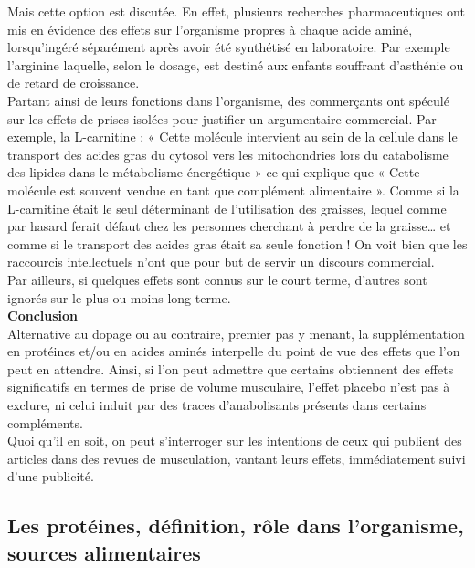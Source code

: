 \documentclass[8pt]{article}
\begin{document}
Mais cette option est discutée. En effet, plusieurs recherches pharmaceutiques ont mis en évidence des effets sur l’organisme propres à chaque acide aminé, lorsqu’ingéré séparément après avoir été synthétisé en laboratoire. Par exemple l’arginine laquelle, selon le dosage, est destiné aux enfants souffrant d’asthénie ou de retard de croissance.\\

Partant ainsi de leurs fonctions dans l’organisme, des commerçants ont spéculé sur les effets de prises isolées pour justifier un argumentaire commercial. Par exemple, la L-carnitine : « Cette molécule intervient au sein de la cellule dans le transport des acides gras du cytosol vers les mitochondries lors du catabolisme des lipides dans le métabolisme énergétique » ce qui explique que « Cette molécule est souvent vendue en tant que complément alimentaire ». Comme si la L-carnitine était le seul déterminant de l’utilisation des graisses, lequel comme par hasard ferait défaut chez les personnes cherchant à perdre de la graisse… et comme si le transport des acides gras était sa seule fonction ! On voit bien que les raccourcis intellectuels n’ont que pour but de servir un discours commercial.\\

Par ailleurs, si quelques effets sont connus sur le court terme, d’autres sont ignorés sur le plus ou moins long terme.\\


\textbf{Conclusion}\\

Alternative au dopage ou au contraire, premier pas y menant, la supplémentation en protéines et/ou en acides aminés interpelle du point de vue des effets que l’on peut en attendre. Ainsi, si l’on peut admettre que certains obtiennent des effets significatifs en termes de prise de volume musculaire, l’effet placebo n’est pas à exclure, ni celui induit par des traces d’anabolisants présents dans certains compléments.\\

Quoi qu’il en soit, on peut s’interroger sur les intentions de ceux qui publient des articles dans des revues de musculation, vantant leurs effets, immédiatement suivi d’une publicité.


\newpage
\subsection{Les protéines, définition, rôle dans l'organisme, sources alimentaires}
\end{document}
